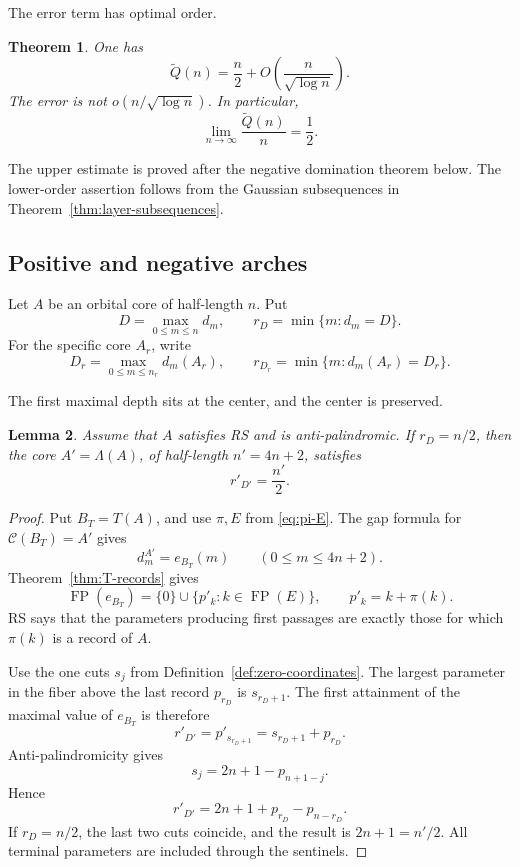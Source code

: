 \documentclass[11pt]{article}
\newtheorem{theorem}{Theorem}[section]
\newtheorem{lemma}[theorem]{Lemma}
\theoremstyle{definition}
\theoremstyle{remark}
\DeclareMathOperator{\FP}{FP}
\newcommand{\Qt}{\widetilde Q}
\newcommand{\Lam}{\Lambda}
\begin{document}
The error term has optimal order.
\begin{theorem}
\label{thm:rate}
One has
\begin{equation}
\label{eq:rate}
 \Qt(n)=\frac n2+O\!\left(\frac{n}{\sqrt{\log n}}\right).
\end{equation}
The error is not \(o(n/\sqrt{\log n})\).  In particular,
\begin{equation}
\label{eq:limit-half}
 \lim_{n\to\infty}\frac{\Qt(n)}n=\frac12.
\end{equation}
\end{theorem}

The upper estimate is proved after the negative domination theorem below.
The lower-order assertion follows from the Gaussian subsequences in
Theorem~\ref{thm:layer-subsequences}.

\subsection{Positive and negative arches}

Let \(A\) be an orbital core of half-length \(n\).  Put
\[
 D=\max_{0\leq m\leq n}d_m,
 \qquad r_D=\min\{m:d_m=D\}.
\]
For the specific core \(A_r\), write
\[
 D_r=\max_{0\leq m\leq n_r}d_m(A_r),
 \qquad
 r_{D_r}=\min\{m:d_m(A_r)=D_r\}.
\]

The first maximal depth sits at the center, and the center is preserved.
\begin{lemma}
\label{lem:first-peak-transport}
Assume that \(A\) satisfies RS and is anti-palindromic.  If \(r_D=n/2\), then
the core \(A'=\Lam(A)\), of half-length \(n'=4n+2\), satisfies
\[
 r'_{D'}=\frac{n'}2.
\]
\end{lemma}

\begin{proof}
Put \(B_T=T(A)\), and use \(\pi,E\) from \eqref{eq:pi-E}.  The gap formula
for \(\mathcal C(B_T)=A'\) gives
\[
 d_m^{A'}=e_{B_T}(m)
 \qquad(0\leq m\leq4n+2).
\]
Theorem~\ref{thm:T-records} gives
\[
 \FP(e_{B_T})=\{0\}\cup\{p'_k:k\in\FP(E)\},
 \qquad p'_k=k+\pi(k).
\]
RS says that the parameters producing first passages are exactly those for
which \(\pi(k)\) is a record of \(A\).

Use the one cuts \(s_j\) from Definition~\ref{def:zero-coordinates}.  The
largest parameter in the fiber above the
last record \(p_{r_D}\) is \(s_{r_D+1}\).  The first attainment of the maximal
value of \(e_{B_T}\) is therefore
\[
 r'_{D'}=p'_{s_{r_D+1}}=s_{r_D+1}+p_{r_D}.
\]
Anti-palindromicity gives
\[
 s_j=2n+1-p_{n+1-j}.
\]
Hence
\[
 r'_{D'}=2n+1+p_{r_D}-p_{n-r_D}.
\]
If \(r_D=n/2\), the last two cuts coincide, and the result is
\(2n+1=n'/2\).  All terminal parameters are included through the sentinels.
\end{proof}
\end{document}
